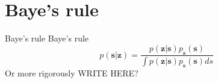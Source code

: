 \documentclass{beamer}
\begin{document}
%
%
%

\section{Baye's rule}

\begin{frame}{Baye's rule}
  Baye's rule
  \[
  p(\mathbf{s}|\mathbf{z}) =
  \frac{p(\mathbf{z}|\mathbf{s})p_{\mathbf{s}}(\mathbf{s})}{\int p(\mathbf{z}|\mathbf{s})p_{\mathbf{s}}(\mathbf{s})ds}
  \]
  Or more rigorously WRITE HERE?
\end{frame}
\end{document}
